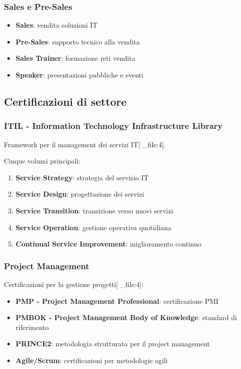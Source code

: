 \documentclass[12pt,a4paper]{article}
\begin{document}
\subsubsection{Sales e Pre-Sales}
\begin{itemize}
    \item \textbf{Sales}: vendita soluzioni IT
    \item \textbf{Pre-Sales}: supporto tecnico alla vendita
    \item \textbf{Sales Trainer}: formazione reti vendita
    \item \textbf{Speaker}: presentazioni pubbliche e eventi
\end{itemize}

\subsection{Certificazioni di settore}

\subsubsection{ITIL - Information Technology Infrastructure Library}
Framework per il management dei servizi IT[ _file:4].

Cinque volumi principali:
\begin{enumerate}
    \item \textbf{Service Strategy}: strategia del servizio IT
    \item \textbf{Service Design}: progettazione dei servizi
    \item \textbf{Service Transition}: transizione verso nuovi servizi
    \item \textbf{Service Operation}: gestione operativa quotidiana
    \item \textbf{Continual Service Improvement}: miglioramento continuo
\end{enumerate}

\subsubsection{Project Management}
Certificazioni per la gestione progetti[ _file:4]:
\begin{itemize}
    \item \textbf{PMP - Project Management Professional}: certificazione PMI
    \item \textbf{PMBOK - Project Management Body of Knowledge}: standard di riferimento
    \item \textbf{PRINCE2}: metodologia strutturata per il project management
    \item \textbf{Agile/Scrum}: certificazioni per metodologie agili
\end{itemize}
\end{document}
